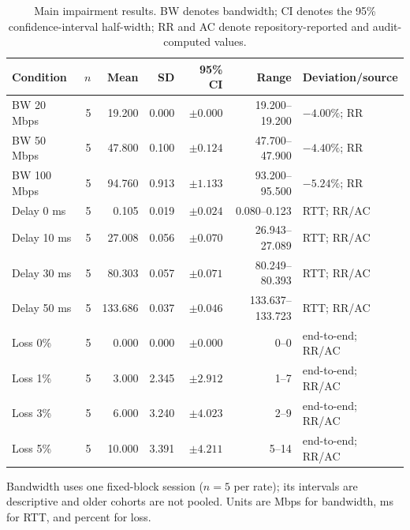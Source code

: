 \begin{table}[t]
\caption{Main impairment results. BW denotes bandwidth; CI denotes the 95\% confidence-interval half-width; RR and AC denote repository-reported and audit-computed values.}
\label{tab:quantitative-results}
\centering
\setlength{\tabcolsep}{2.5pt}
\begin{tabular}{lrrrrrl}
\hline
Condition & $n$ & Mean & SD & 95\% CI & Range & Deviation/source \\
\hline
BW 20 Mbps & 5 & 19.200 & 0.000 & $\pm0.000$ & 19.200--19.200 & $-4.00\%$; RR \\
BW 50 Mbps & 5 & 47.800 & 0.100 & $\pm0.124$ & 47.700--47.900 & $-4.40\%$; RR \\
BW 100 Mbps & 5 & 94.760 & 0.913 & $\pm1.133$ & 93.200--95.500 & $-5.24\%$; RR \\
Delay 0 ms & 5 & 0.105 & 0.019 & $\pm0.024$ & 0.080--0.123 & RTT; RR/AC \\
Delay 10 ms & 5 & 27.008 & 0.056 & $\pm0.070$ & 26.943--27.089 & RTT; RR/AC \\
Delay 30 ms & 5 & 80.303 & 0.057 & $\pm0.071$ & 80.249--80.393 & RTT; RR/AC \\
Delay 50 ms & 5 & 133.686 & 0.037 & $\pm0.046$ & 133.637--133.723 & RTT; RR/AC \\
Loss 0\% & 5 & 0.000 & 0.000 & $\pm0.000$ & 0--0 & end-to-end; RR/AC \\
Loss 1\% & 5 & 3.000 & 2.345 & $\pm2.912$ & 1--7 & end-to-end; RR/AC \\
Loss 3\% & 5 & 6.000 & 3.240 & $\pm4.023$ & 2--9 & end-to-end; RR/AC \\
Loss 5\% & 5 & 10.000 & 3.391 & $\pm4.211$ & 5--14 & end-to-end; RR/AC \\
\hline
\end{tabular}
\vspace{1mm}

\raggedright Bandwidth uses one fixed-block session ($n=5$ per rate); its intervals are descriptive and older cohorts are not pooled. Units are Mbps for bandwidth, ms for RTT, and percent for loss.
\end{table}
